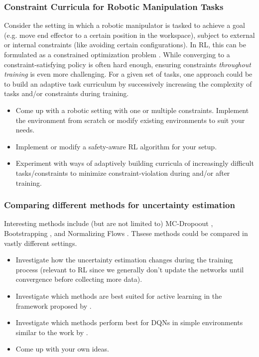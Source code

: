 \documentclass[a4paper]{article}
\begin{document}
\subsubsection{Constraint Curricula for Robotic Manipulation Tasks}
Consider the setting in which a robotic manipulator is tasked to achieve a goal (e.g. move end effector to a certain position in the workspace), subject to external or internal constraints (like avoiding certain configurations). In RL, this can be formulated as a constrained optimization problem \cite{Achiam2019BenchmarkingSE}. While converging to a constraint-satisfying policy is often hard enough, ensuring constraints \textit{throughout training} is even more challenging. For a given set of tasks, one approach could be to build an adaptive task curriculum by successively increasing the complexity of tasks and/or constraints during training.
\begin{itemize}
	\item Come up with a robotic setting with one or multiple constraints. Implement the environment from scratch or modify existing environments to suit your needs.
	\item Implement or modify a safety-aware RL algorithm for your setup.
	\item Experiment with ways of adaptively building curricula of increasingly difficult tasks/constraints to minimize constraint-violation during and/or after training.
\end{itemize}


\subsubsection{Comparing different methods for uncertainty estimation}
Interesting methods include (but are not limited to) MC-Dropoout \cite{Gal2016}, Bootstrapping \cite{Osband2018}, and Normalizing Flows \cite{louizos2017multiplicative}. Thsese methods could be compared in vastly different settings.
\begin{itemize}
  \item Investigate how the uncertainty estimation changes during the training process (relevant to RL since we generally don’t update the networks until convergence before collecting more data).
  \item Investigate which methods are best suited for active learning in the framework proposed by \cite{gal2017active}.
  \item Investigate which methods perform best for DQNs in simple environments similar to the work by \cite{touati2018randomized}.
  \item Come up with your own ideas.
\end{itemize}
\end{document}
